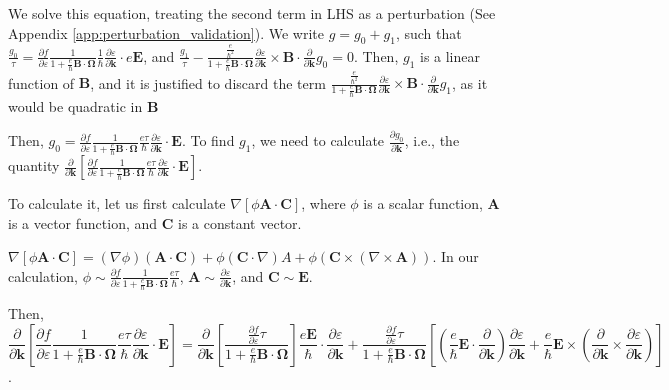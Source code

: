 \documentclass{revtex4-2}
\newcommand{\bvec}[1]{{\mathbf #1}}
\begin{document}
We solve this equation, treating the second term in LHS as a perturbation (See Appendix \ref{app:perturbation_validation}).
We write $g = g_0 + g_1$, such that $\frac{g_0}{\tau} = \frac{\partial f}{\partial \varepsilon}\frac{1}{1 + \frac{e}{\hbar} \bvec{B}\cdot\bvec{\Omega}}
\frac{1}{\hbar} \frac{\partial \varepsilon}{\partial \bvec{k}}\cdot e \bvec{E}$, and $\frac{g_1}{\tau} -\frac{\frac{e}{\hbar^2} }{1 + \frac{e}{\hbar} \bvec{B}\cdot\bvec{\Omega}} \frac{\partial \varepsilon}{\partial \bvec{k}} \times \bvec{B} \cdot\frac{\partial}{\partial \bvec{k}} g_0 = 0$.
Then, $g_1$ is a linear function of $\bvec{B}$, and it is justified to discard the term $\frac{\frac{e}{\hbar^2} }{1 + \frac{e}{\hbar} \bvec{B}\cdot\bvec{\Omega}} \frac{\partial \varepsilon}{\partial \bvec{k}} \times \bvec{B} \cdot\frac{\partial}{\partial \bvec{k}} g_1$, as it would be quadratic in $\bvec{B}$


Then, ${g_0} = \frac{\partial f} {\partial \varepsilon}\frac{1}{1 + \frac{e}{\hbar} \bvec{B}\cdot\bvec{\Omega}}
\frac{e \tau}{\hbar} \frac{\partial \varepsilon}{\partial \bvec{k}}\cdot \bvec{E}$. To find $g_1$, we need to calculate $\frac{\partial g_0}{\partial \bvec{k}}$, i.e., the quantity 
$\frac{\partial}{\partial \bvec{k}} \left[ \frac{\partial f} {\partial \varepsilon}\frac{1}{1 + \frac{e}{\hbar} \bvec{B}\cdot\bvec{\Omega}}
\frac{e \tau}{\hbar} \frac{\partial \varepsilon}{\partial \bvec{k}}\cdot \bvec{E} \right]$.

To calculate it, let us first calculate $\nabla \left[\phi \bvec{A}\cdot\bvec{C}\right]$, where $\phi$ is a scalar function, $\bvec{A}$ is a vector function, and $\bvec{C}$ is a constant vector.

$\nabla \left[\phi \bvec{A}\cdot\bvec{C}\right] = (\nabla \phi) (\bvec{A}\cdot\bvec{C}) + \phi (\bvec{C}\cdot \nabla){A} + \phi (\bvec{C}\times(\nabla\times\bvec{A})) $. In our calculation, $\phi \sim \frac{\partial f} {\partial \varepsilon}\frac{1}{1 + \frac{e}{\hbar} \bvec{B}\cdot\bvec{\Omega}}
\frac{e \tau}{\hbar}$, $\bvec{A} \sim \frac{\partial \varepsilon}{\partial \bvec{k}}$, and $\bvec{C} \sim \bvec{E}$.

Then, $$\frac{\partial}{\partial \bvec{k}} \left[ \frac{\partial f} {\partial \varepsilon}\frac{1}{1 + \frac{e}{\hbar} \bvec{B}\cdot\bvec{\Omega}}
\frac{e \tau}{\hbar} \frac{\partial \varepsilon}{\partial \bvec{k}}\cdot \bvec{E} \right] = \frac{\partial}{\partial \bvec{k}} \left[ \frac{\frac{\partial f} {\partial \varepsilon} \tau}{1 + \frac{e}{\hbar} \bvec{B}\cdot\bvec{\Omega}}
 \right] \frac{e \bvec{E}}{\hbar} \cdot \frac{\partial \varepsilon}{\partial \bvec{k}} + \frac{\frac{\partial f} {\partial \varepsilon} \tau}{1 + \frac{e}{\hbar} \bvec{B}\cdot\bvec{\Omega}} \left[(\frac{e}{\hbar} \bvec{E}\cdot \frac{\partial }{\partial \bvec{k}} )\frac{\partial \varepsilon}{\partial \bvec{k}} + \frac{e}{\hbar} \bvec{E}\times (\frac{\partial }{\partial \bvec{k}} \times \frac{\partial \varepsilon}{\partial \bvec{k}}) \right]$$.
 
\end{document}
